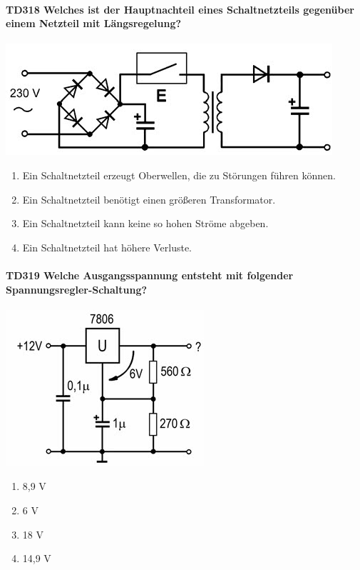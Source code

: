 \documentclass[8pt]{article}
\begin{document}
\begin{enumerate}
\begin{enumerate}[nolistsep,label=\Alph*]
\paragraph*{TD318 Welches ist der Hauptnachteil eines Schaltnetzteils gegenüber einem Netzteil mit Längsregelung?}
\begin{center}
	\begin{minipage}{\linewidth}
		\centering
		\includegraphics[scale=1.0]{pics/td318_a.jpg}
	\end{minipage}
\end{center}
\begin{enumerate}[nolistsep,label=\Alph*]
\item Ein Schaltnetzteil erzeugt Oberwellen, die zu Störungen führen können.
\item Ein Schaltnetzteil benötigt einen größeren Transformator.
\item Ein Schaltnetzteil kann keine so hohen Ströme abgeben.
\item Ein Schaltnetzteil hat höhere Verluste.
\end{enumerate}

\paragraph*{TD319 Welche Ausgangsspannung entsteht mit folgender Spannungsregler-Schaltung?}
\begin{center}
	\begin{minipage}{\linewidth}
		\centering
		\includegraphics[scale=1.0]{pics/td319_a.jpg}
	\end{minipage}
\end{center}
\begin{enumerate}[nolistsep,label=\Alph*]
\item 8,9 V
\item 6 V
\item 18 V
\item 14,9 V
\end{enumerate}


\end{enumerate}
\end{enumerate}
\end{document}
